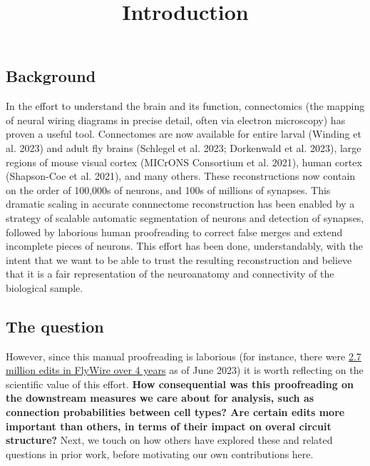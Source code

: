 \documentclass[
  letterpaper,
  DIV=11,
  numbers=noendperiod]{scrartcl}
\title{Introduction}
\author{}
\date{}
\begin{document}
\maketitle
\ifdefined\Shaded\renewenvironment{Shaded}{\begin{tcolorbox}[enhanced, boxrule=0pt, borderline west={3pt}{0pt}{shadecolor}, frame hidden, interior hidden, breakable, sharp corners]}{\end{tcolorbox}}\fi

\hypertarget{background}{%
\subsection{Background}\label{background}}

In the effort to understand the brain and its function, connectomics
(the mapping of neural wiring diagrams in precise detail, often via
electron microscopy) has proven a useful tool. Connectomes are now
available for entire larval (Winding et al. 2023) and adult fly brains
(Schlegel et al. 2023; Dorkenwald et al. 2023), large regions of mouse
visual cortex (MICrONS Consortium et al. 2021), human cortex
(Shapson-Coe et al. 2021), and many others. These reconstructions now
contain on the order of 100,000s of neurons, and 100s of millions of
synapses. This dramatic scaling in accurate connnectome reconstruction
has been enabled by a strategy of scalable automatic segmentation of
neurons and detection of synapses, followed by laborious human
proofreading to correct false merges and extend incomplete pieces of
neurons. This effort has been done, understandably, with the intent that
we want to be able to trust the resulting reconstruction and believe
that it is a fair representation of the neuroanatomy and connectivity of
the biological sample.

\hypertarget{the-question}{%
\subsection{The question}\label{the-question}}

However, since this manual proofreading is laborious (for instance,
there were
\href{https://x.com/FlyWireNews/status/1674886396564193281?s=20}{2.7
million edits in FlyWire over 4 years} as of June 2023) it is worth
reflecting on the scientific value of this effort. \textbf{How
consequential was this proofreading on the downstream measures we care
about for analysis, such as connection probabilities between cell types?
Are certain edits more important than others, in terms of their impact
on overal circuit structure?} Next, we touch on how others have explored
these and related questions in prior work, before motivating our own
contributions here.
\end{document}
